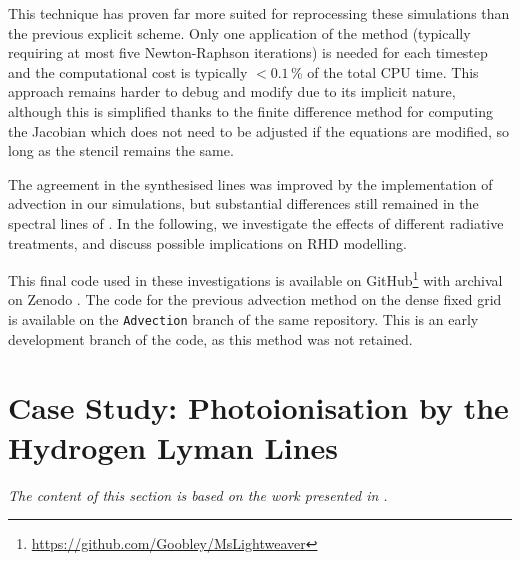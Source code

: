 This technique has proven far more suited for reprocessing these simulations than the previous explicit scheme.
Only one application of the method (typically requiring at most five Newton-Raphson iterations) is needed for each timestep and the computational cost is typically $<0.1\,\%$ of the total CPU time.
This approach remains harder to debug and modify due to its implicit nature, although this is simplified thanks to the finite difference method for computing the Jacobian which does not need to be adjusted if the equations are modified, so long as the stencil remains the same.

The agreement in the synthesised lines was improved by the implementation of advection in our simulations, but substantial differences still remained in the spectral lines of \Caii{}.
In the following, we investigate the effects of different radiative treatments, and discuss possible implications on RHD modelling.

This final code used in these investigations is available on GitHub\footnote{\url{https://github.com/Goobley/MsLightweaver}} with archival on Zenodo \citep{MsLwThesisRelease}.
The code for the previous advection method on the dense fixed grid is available on the \texttt{Advection} branch of the same repository.
This is an early development branch of the code, as this method was not retained.


\section{Case Study: \Caii{} Photoionisation by the Hydrogen Lyman Lines}\label{Sec:CaiiPhotoionisation}

\emph{The content of this section is based on the work presented in \citet{Osborne2021a}.}

